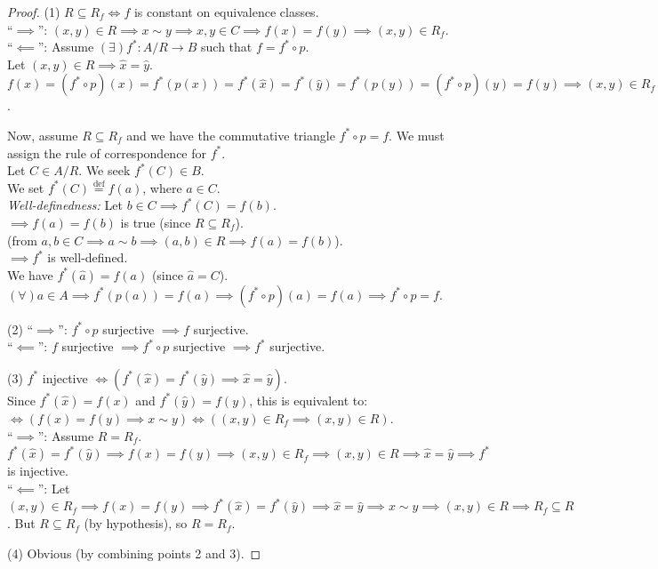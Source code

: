 \begin{proof}
(1) $R \subseteq R_f \iff f$ is constant on equivalence classes. \\
``$\implies$'': $(x,y) \in R \implies x \sim y \implies x, y \in C \implies f(x) = f(y) \implies (x,y) \in R_f$. \\
``$\impliedby$'': Assume $(\exists) f^*: A/R \rightarrow B$ such that $f = f^* \circ p$. \\
Let $(x,y) \in R \implies \hat{x} = \hat{y}$. \\
$f(x) = (f^* \circ p)(x) = f^*(p(x)) = f^*(\hat{x}) = f^*(\hat{y}) = f^*(p(y)) = (f^* \circ p)(y) = f(y) \implies (x,y) \in R_f$.

Now, assume $R \subseteq R_f$ and we have the commutative triangle $f^* \circ p = f$. We must assign the rule of correspondence for $f^*$. \\
Let $C \in A/R$. We seek $f^*(C) \in B$. \\
We set $f^*(C) \overset{\text{def}}{=} f(a)$, where $a \in C$. \\
\textit{Well-definedness:} Let $b \in C \implies f^*(C) = f(b)$. \\
$\implies f(a) = f(b)$ is true (since $R \subseteq R_f$). \\
(from $a,b \in C \implies a \sim b \implies (a,b) \in R \implies f(a) = f(b)$). \\
$\implies f^*$ is well-defined. \\
We have $f^*(\hat{a}) = f(a)$ (since $\hat{a} = C$). \\
$(\forall) a \in A \implies f^*(p(a)) = f(a) \implies (f^* \circ p)(a) = f(a) \implies f^* \circ p = f$.

(2) 
``$\implies$'': $f^* \circ p$ surjective $\implies f$ surjective. \\
``$\impliedby$'': $f$ surjective $\implies f^* \circ p$ surjective $\implies f^*$ surjective.

(3) $f^*$ injective $\iff \left( f^*(\hat{x}) = f^*(\hat{y}) \implies \hat{x} = \hat{y} \right)$. \\
Since $f^*(\hat{x}) = f(x)$ and $f^*(\hat{y}) = f(y)$, this is equivalent to: \\
$\iff \left( f(x) = f(y) \implies x \sim y \right) \iff \left( (x,y) \in R_f \implies (x,y) \in R \right)$. \\
``$\implies$'': Assume $R = R_f$. \\
$f^*(\hat{x}) = f^*(\hat{y}) \implies f(x) = f(y) \implies (x,y) \in R_f \implies (x,y) \in R \implies \hat{x} = \hat{y} \implies f^*$ is injective. \\
``$\impliedby$'': Let $(x,y) \in R_f \implies f(x) = f(y) \implies f^*(\hat{x}) = f^*(\hat{y}) \implies \hat{x} = \hat{y} \implies x \sim y \implies (x,y) \in R \implies R_f \subseteq R$. But $R \subseteq R_f$ (by hypothesis), so $R = R_f$.

(4) Obvious (by combining points 2 and 3).
\end{proof}

